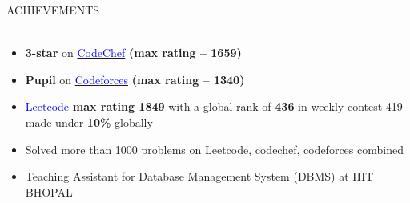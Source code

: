 \documentclass[a4paper]{article}
\newcommand{\lineunder} {
    \vspace*{-8pt} \\
    \hspace*{-18pt} \hrulefill \\
}
\newcommand{\header} [1] {
    {\hspace*{-18pt}\vspace*{6pt} \textsc{#1}}
    \vspace*{-6pt} \lineunder
}
\begin{document}
\header{ACHIEVEMENTS}
\begin{itemize}[leftmargin=*, itemsep=0pt, topsep=0pt] %
    \item \textbf{3-star} on \href{https://www.codechef.com/users/neat_tiger_70}{\textcolor{blue}{CodeChef}} \textbf{(max rating – 1659)}
    \item \textbf{Pupil} on \href{https://codeforces.com/profile/narutouzumaki16092003}{\textcolor{blue}{Codeforces}} \textbf{(max rating – 1340)}
    \item \href{https://leetcode.com/u/srivastavaaryanalc76/}{\textcolor{blue}{Leetcode}} \textbf{max rating 1849} with a global rank of \textbf{436} in weekly contest 419 made under \textbf{10\%} globally
     \item Solved more than 1000 problems on Leetcode, codechef, codeforces combined
    \item Teaching Assistant for Database Management System (DBMS) at IIIT BHOPAL
\end{itemize}


\end{document}
